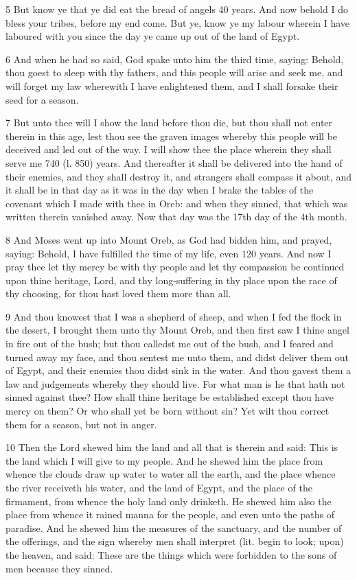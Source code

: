 \par 5 But know ye that ye did eat the bread of angels 40 years. And now behold I do bless your tribes, before my end come. But ye, know ye my labour wherein I have laboured with you since the day ye came up out of the land of Egypt.

\par 6 And when he had so said, God spake unto him the third time, saying: Behold, thou goest to sleep with thy fathers, and this people will arise and seek me, and will forget my law wherewith I have enlightened them, and I shall forsake their seed for a season. 

\par 7 But unto thee will I show the land before thou die, but thou shall not enter therein in this age, lest thou see the graven images whereby this people will be deceived and led out of the way. I will show thee the place wherein they shall serve me 740 (l. 850) years. And thereafter it shall be delivered into the hand of their enemies, and they shall destroy it, and strangers shall compass it about, and it shall be in that day as it was in the day when I brake the tables of the covenant which I made with thee in Oreb: and when they sinned, that which was written therein vanished away. Now that day was the 17th day of the 4th month.

\par 8 And Moses went up into Mount Oreb, as God had bidden him, and prayed, saying: Behold, I have fulfilled the time of my life, even 120 years. And now I pray thee let thy mercy be with thy people and let thy compassion be continued upon thine heritage, Lord, and thy long-suffering in thy place upon the race of thy choosing, for thou hast loved them more than all. 

\par 9 And thou knowest that I was a shepherd of sheep, and when I fed the flock in the desert, I brought them unto thy Mount Oreb, and then first saw I thine angel in fire out of the bush; but thou calledst me out of the bush, and I feared and turned away my face, and thou sentest me unto them, and didst deliver them out of Egypt, and their enemies thou didst sink in the water. And thou gavest them a law and judgements whereby they should live. For what man is he that hath not sinned against thee? How shall thine heritage be established except thou have mercy on them? Or who shall yet be born without sin? Yet wilt thou correct them for a season, but not in anger.

\par 10 Then the Lord shewed him the land and all that is therein and said: This is the land which I will give to my people. And he shewed him the place from whence the clouds draw up water to water all the earth, and the place whence the river receiveth his water, and the land of Egypt, and the place of the firmament, from whence the holy land only drinketh. He shewed him also the place from whence it rained manna for the people, and even unto the paths of paradise. And he shewed him the measures of the sanctuary, and the number of the offerings, and the sign whereby men shall interpret (lit. begin to look; upon) the heaven, and said: These are the things which were forbidden to the sons of men because they sinned. 


